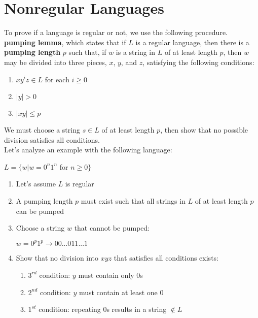 \documentclass{article}
\begin{document}
\section{Nonregular Languages}
To prove if a language is regular or not, we use the following procedure.
\vspace{0.2cm} \textbf{pumping lemma}, which states that if $L$ is a regular language, then there is a \textbf{pumping length} $p$ such that, if $w$ is a string in $L$ of at least length $p$, then $w$ may be divided into three pieces, $x$, $y$, and $z$, satisfying the following conditions:
\begin{enumerate}
    \item $xy^iz \in L$ for each $i \geq 0$
    \item $|y| > 0$
    \item $|xy| \leq p$ 
\end{enumerate}
We must choose a string $s \in L$ of at least length $p$, then show that no possible division satisfies all conditions. \\
Let's analyze an example with the following language:
\begin{center}
    $L = \{w|w = 0^n1^n$ for $n \geq0\}$
\end{center}
\begin{enumerate}
    \item Let's assume $L$ is regular
    \item A pumping length $p$ must exist such that all strings in $L$ of at least length $p$ can be pumped
    \item Choose a string $w$ that cannot be pumped:
        \begin{center}
            $w=0^p1^p \rightarrow 00...0 11...1$
        \end{center}
    \item Show that no division into $xyz$ that satisfies all conditions exists:
        \begin{enumerate}
            \item $3^{rd}$ condition: $y$ must contain only $0$s
            \item $2^{nd}$ condition: $y$ must contain at least one $0$
            \item $1^{st}$ condition: repeating $0$s results in a string $\notin L$
        \end{enumerate}
\end{enumerate}
\newpage
\end{document}
